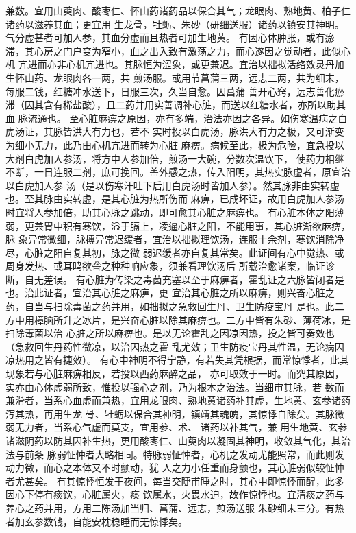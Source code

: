 \documentclass[a4paper,12pt,UTF8,twoside]{ctexbook}
\begin{document}
兼数。宜用山萸肉、酸枣仁、怀山药诸药品以保合其气；龙眼肉、熟地黄、柏子仁诸药以滋养其血；更宜用 
生龙骨，牡蛎、朱砂（研细送服）诸药以镇安其神明。气分虚甚者可加人参，其血分虚而且热者可加生地黄。 
有因心体肿胀，或有瘀滞，其心房之门户变为窄小，血之出入致有激荡之力，而心遂因之觉动者，此似心机 
亢进而亦非心机亢进也。其脉恒为涩象，或更兼迟。宜治以拙拟活络效灵丹加生怀山药、龙眼肉各一两，共 
煎汤服。或用节菖蒲三两，远志二两，共为细末，每服二钱，红糖冲水送下，日服三次，久当自愈。因菖蒲 
善开心窍，远志善化瘀滞（因其含有稀盐酸），且二药并用实善调补心脏，而送以红糖水者，亦所以助其血 
脉流通也。 
至心脏麻痹之原因，亦有多端，治法亦因之各异。如伤寒温病之白虎汤证，其脉皆洪大有力也，若不 
实时投以白虎汤，脉洪大有力之极，又可渐变为细小无力，此乃由心机亢进而转为心脏 
麻痹。病候至此，极为危险，宜急投以大剂白虎加人参汤，将方中人参加倍，煎汤一大碗，分数次温饮下， 
使药力相继不断，一日连服二剂，庶可挽回。盖外感之热，传入阳明，其热实脉虚者，原宜治以白虎加人参 
汤（是以伤寒汗吐下后用白虎汤时皆加人参）。然其脉非由实转虚也。至其脉由实转虚，是其心脏为热所伤而 
麻痹，已成坏证，故用白虎加人参汤时宜将人参加倍，助其心脉之跳动，即可愈其心脏之麻痹也。 
有心脏本体之阳薄弱，更兼胃中积有寒饮，溢于膈上，凌逼心脏之阳，不能用事，其心脏渐欲麻痹，脉 
象异常微细，脉搏异常迟缓者，宜治以拙拟理饮汤，连服十余剂，寒饮消除净尽，心脏之阳自复其初，脉之微 
弱迟缓者亦自复其常矣。此证间有心中觉热、或周身发热、或耳鸣欲聋之种种响应象，须兼看理饮汤后 
所载治愈诸案，临证诊断，自无差误。 
有心脏为传染之毒菌充塞以至于麻痹者，霍乱证之六脉皆闭者是也。治此证者，宜治其心脏之麻痹，更 
宜治其心脏之所以麻痹，则兴奋心脏之药，自当与扫除毒菌之药并用，如拙拟之急救回生丹、卫生防疫宝丹 
是也。此二方中用樟脑所升之冰片，是兴奋心脏以除其麻痹也。二方中皆有朱砂、薄荷冰，是扫除毒菌以治 
心脏之所以麻痹也。是以无论霍乱之因凉因热，投之皆可奏效也（急救回生丹药性微凉，以治因热之霍 
乱尤效；卫生防疫宝丹其性温，无论病因凉热用之皆有捷效）。 
有心中神明不得宁静，有若失其凭根据，而常惊悸者，此其现象若与心脏麻痹相反，若投以西药麻醉之品， 
亦可取效于一时。而究其原因，实亦由心体虚弱所致，惟投以强心之剂，乃为根本之治法。当细审其脉，若 
数而兼滑者，当系心血虚而兼热，宜用龙眼肉、熟地黄诸药补其虚，生地黄、玄参诸药泻其热，再用生龙 
骨、牡蛎以保合其神明，镇靖其魂魄，其惊悸自除矣。其脉微弱无力者，当系心气虚而莫支，宜用参、术、 
诸药以补其气，兼 
用生地黄、玄参诸滋阴药以防其因补生热，更用酸枣仁、山萸肉以凝固其神明，收敛其气化，其治法与前条 
脉弱怔忡者大略相同。特脉弱怔忡者，心机之发动尤能照常，而此则发动力微，而心之本体又不时颤动，犹 
人之力小任重而身颤也，其心脏弱似较怔忡者尤甚矣。 
有其惊悸恒发于夜间，每当交睫甫睡之时，其心中即惊悸而醒，此多因心下停有痰饮，心脏属火，痰 
饮属水，火畏水迫，故作惊悸也。宜清痰之药与养心之药并用，方用二陈汤加当归、菖蒲、远志，煎汤送服 
朱砂细末三分。有热者加玄参数钱，自能安枕稳睡而无惊悸矣。 
\end{document}
